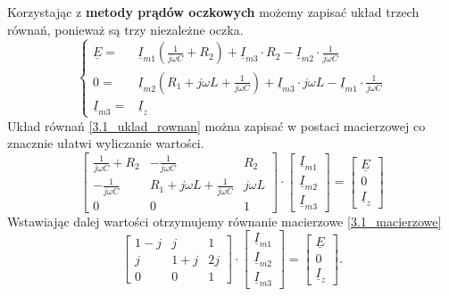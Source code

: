\documentclass[12pt, a4paper]{article}
\begin{document}
Korzystając z \textbf{metody prądów oczkowych} możemy zapisać układ trzech równań, ponieważ
są trzy niezależne oczka.
\begin{equation}\label{3.1_uklad_rownan}
  \left\{
  \begin{array}{rl}
    \underline{E} =      & \underline{I}_{m1}\left(\frac{1}{j\omega C}+R_2\right) + \underline{I}_{m3}\cdot R_2-\underline{I}_{m2}\cdot \frac{1}{j\omega C}                 \\
    0 =                  & \underline{I}_{m2}\left(R_1+j\omega L+\frac{1}{j\omega C}\right)+\underline{I}_{m3}\cdot j\omega L - \underline{I}_{m1}\cdot \frac{1}{j\omega C} \\
    \underline{I}_{m3} = & \underline{I}_z
  \end{array}
  \right.
\end{equation}
Układ równań \ref{3.1_uklad_rownan} można zapisać w postaci macierzowej co znacznie
ułatwi wyliczanie wartości.
\begin{equation*}
  \begin{bmatrix}
    \frac{1}{j\omega C}+R_2 & -\frac{1}{j\omega C}              & R_2       \\
    -\frac{1}{j\omega C}    & R_1+j\omega L+\frac{1}{j\omega C} & j\omega L \\
    0                       & 0                                 & 1
  \end{bmatrix}
  \cdot
  \begin{bmatrix}
    \underline{I}_{m1} \\
    \underline{I}_{m2} \\
    \underline{I}_{m3}
  \end{bmatrix}
  =
  \begin{bmatrix}
    \underline{E} \\
    0             \\
    \underline{I}_z
  \end{bmatrix}
\end{equation*}
Wstawiając dalej wartości otrzymujemy równanie macierzowe \ref{3.1_macierzowe}
\begin{equation}\label{3.1_macierzowe}
  \begin{bmatrix}
    1-j & j   & 1  \\
    j   & 1+j & 2j \\
    0   & 0   & 1
  \end{bmatrix}
  \cdot
  \begin{bmatrix}
    \underline{I}_{m1} \\
    \underline{I}_{m2} \\
    \underline{I}_{m3}
  \end{bmatrix}
  =
  \begin{bmatrix}
    \underline{E} \\
    0             \\
    \underline{I}_z
  \end{bmatrix}.
\end{equation}
\end{document}
